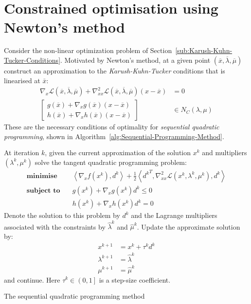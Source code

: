\documentclass[a4paper,twoside,10pt,english]{report}
\begin{document}
\section{\label{sub:Constrained-optimisation-Newton}Constrained optimisation using Newton's method}
Consider the non-linear optimization problem of Section~\ref{sub:Karush-Kuhn-Tucker-Conditions}.
Motivated by Newton's method, at a given point 
$\left(\overline{x},\overline{\lambda},\overline{\mu}\right)$
construct an approximation to the \emph{Karush-Kuhn-Tucker} conditions that
is linearised at $\bar{x}$:
\begin{align*}
\nabla_{x}\mathcal{L}\left(\overline{x},\overline{\lambda},\overline{\mu}\right)
+\nabla_{xx}^{2}\mathcal{L}\left(\overline{x},\overline{\lambda},\overline{\mu}\right)\left(x-\overline{x}\right) &= 0\\
\left[\begin{array}{c}
g\left(\overline{x}\right)+\nabla_{x}g\left(\overline{x}\right)
\left(x-\overline{x}\right)\\
h\left(\overline{x}\right)+\nabla_{x}h\left(\overline{x}\right)
\left(x-\overline{x}\right)
\end{array}\right] & \in N_{C}\left(\lambda,\mu\right)
\end{align*}
These are the necessary conditions of optimality for 
\emph{sequential quadratic programming}, shown in 
Algorithm~\ref{alg:Sequential-Programming-Method}.

\begin{algorithm}
At iteration $k$, given the current approximation of the solution
$x^{k}$ and multipliers $\left(\lambda^{k},\mu^{k}\right)$ solve
the tangent quadratic programming problem:
\begin{align*}
\textbf{minimise} \quad & 
\left\langle \nabla_x f\left(x^{k}\right),d^{k}\right\rangle 
+\frac{1}{2}\left\langle {d^{k}}^T,\nabla_{xx}^{2}
\mathcal{L}\left(x^{k},\lambda^{k},\mu^{k}\right),d^{k}\right\rangle \\
\textbf{subject to} \quad & g\left(x^{k}\right)
+\nabla_{x}g\left(x^{k}\right)d^{k}\le0\\
& h\left(x^{k}\right)+\nabla_{x}h\left(x^{k}\right)d^{k}=0
\end{align*}
Denote the solution to this problem by $d^{k}$ and the Lagrange multipliers
associated with the constraints by $\hat{\lambda}^{k}$ and $\hat{\mu}^{k}$.
Update the approximate solution by:
\begin{align*}
x^{k+1} &= x^{k}+\tau^{k}d^{k}\\
\lambda^{k+1} &= \hat{\lambda}^{k}\\
\mu^{k+1} &= \hat{\mu}^{k}
\end{align*}
and continue. Here $\tau^{k}\in\left(0,1\right]$ is a step-size coefficient.
\caption{The sequential quadratic programming method}
\label{alg:Sequential-Programming-Method}
\end{algorithm}
\end{document}

